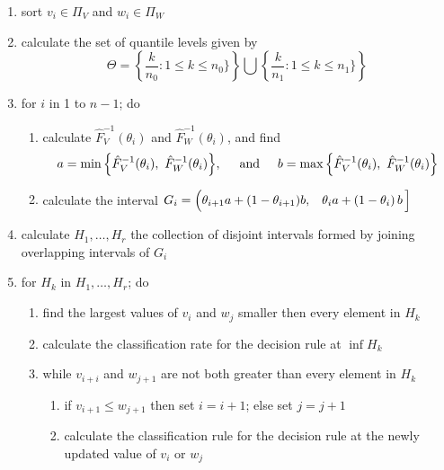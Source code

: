 \begin{enumerate}[label=\arabic*., align=left]
\item sort $v_i \in \Pi_V$ and $w_i \in \Pi_W$
\item calculate the set of quantile levels given by
  \begin{equation*}
    \Theta =
    \left\{ \frac{k}{n_0}: 1 \leq k \leq n_0 \} \right\} \bigcup
    \left\{ \frac{k}{n_1}: 1 \leq k \leq n_1 \} \right\}
  \end{equation*}
\item for $i$ in 1 to $n - 1$; do
  \begin{enumerate}[label=\alph*)]
  \item calculate $\hat{F}_V^{-1}(\theta_i)$ and $\hat{F}_W^{-1}(\theta_i)$, and
    find
    \begin{equation*}
      a = \min \Big\{ \hat{F}_V^{-1}(\theta_i),~ \hat{F}_W^{-1}(\theta_i) \Big\},
      \hspace{5mm} \text{and} \hspace{5mm}
      b = \max \Big\{ \hat{F}_V^{-1}(\theta_i),~ \hat{F}_W^{-1}(\theta_i) \Big\}
    \end{equation*}
  \item calculate the interval
    $G_i = \Big(
    \theta_{i+1}a + (1 - \theta_{i+1}) b,
    \hspace{3mm}
    \theta_{i}a + (1 - \theta_{i})\, b\,
    \Big]$
  \end{enumerate}
\item calculate $H_1, \dots, H_r$ the collection of disjoint intervals formed by
  joining overlapping intervals of $G_i$
\item for $H_k$ in $H_1, \dots, H_r$; do
  \begin{enumerate}[label=\alph*)]
  \item find the largest values of $v_i$ and $w_j$ smaller then every element in
    $H_k$
  \item calculate the classification rate for the decision rule at $\inf H_k$
  \item while $v_{i+i}$ and $w_{j+1}$ are not both greater than every element in
    $H_k$
    \begin{enumerate}[label=\roman*.]
    \item if $v_{i+1} \leq w_{j+1}$ then set $i = i + 1$; else set $j = j + 1$
    \item calculate the classification rule for the decision rule at the newly
      updated value of $v_i$ or $w_j$
    \end{enumerate}
  \end{enumerate}
\end{enumerate}

